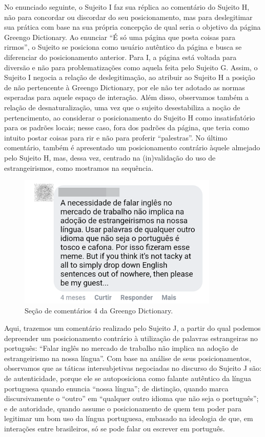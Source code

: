 \documentclass[portuguese]{textolivre}
\begin{document}
No enunciado seguinte, o Sujeito I faz sua réplica ao comentário do Sujeito H, não para concordar ou discordar do seu posicionamento, mas para deslegitimar sua prática com base na sua própria concepção de qual seria o objetivo da página Greengo Dictionary. Ao enunciar “É só uma página que posta coisas para rirmos”, o Sujeito se posiciona como usuário autêntico da página e busca se diferenciar do posicionamento anterior. Para I, a página está voltada para diversão e não para problematizações como aquela feita pelo Sujeito G. Assim, o Sujeito I negocia a relação de deslegitimação, ao atribuir ao Sujeito H a posição de não pertencente à Greengo Dictionary, por ele não ter adotado as normas esperadas para aquele espaço de interação. Além disso, observamos também a relação de desnaturalização, uma vez que o sujeito desestabiliza a noção de pertencimento, ao considerar o posicionamento do Sujeito H como insatisfatório para os padrões locais; nesse caso, fora dos padrões da página, que teria como intuito postar coisas para rir e não para proferir “palestras”. No último comentário, também é apresentado um posicionamento contrário àquele almejado pelo Sujeito H, mas, dessa vez, centrado na (in)validação do uso de estrangeirismos, como mostramos na sequência.

\begin{figure}[htbp]
 \centering
 \includegraphics[width=0.85\textwidth]{Fig7.png}
 \caption{Seção de comentários 4 da Greengo Dictionary.}
 \label{fig7}
\end{figure}

Aqui, trazemos um comentário realizado pelo Sujeito J, a partir do qual podemos depreender um posicionamento contrário à utilização de palavras estrangeiras no português: “Falar inglês no mercado de trabalho não implica na adoção de estrangeirismo na nossa língua”. Com base na análise de seus posicionamentos, observamos que as táticas intersubjetivas negociadas no discurso do Sujeito J são: de autenticidade, porque ele se autoposiciona como falante autêntico da língua portuguesa quando enuncia “nossa língua”; de distinção, quando marca discursivamente o “outro” em “qualquer outro idioma que não seja o português”; e de autoridade, quando assume o posicionamento de quem tem poder para legitimar um bom uso da língua portuguesa, embasado na ideologia de que, em interações entre brasileiros, só se pode falar ou escrever em português.				
\end{document}
